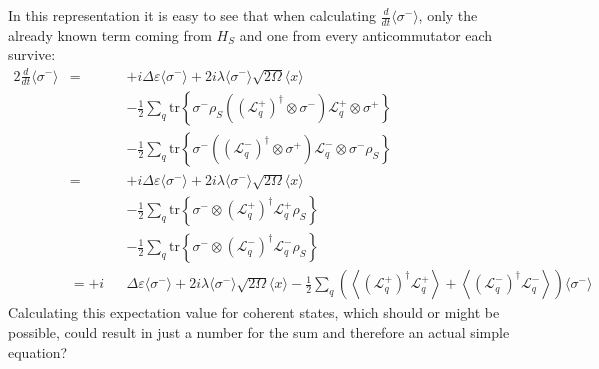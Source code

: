 	In this representation it is easy to see that when calculating $\frac{d}{dt} \langle \sigma^- \rangle$, only the already known term coming from $H_S$ and one from every anticommutator each survive:
	\begin{alignat*}{2}
		\frac{d}{dt} \langle \sigma^- \rangle  &=&&+i \Delta \varepsilon \langle \sigma^- \rangle + 2 i \lambda \langle \sigma^- \rangle \sqrt{2 \Omega} \langle x \rangle \\
		~&~&&-\frac{1}{2} \sum_q \text{tr}\left\{\sigma^- \rho_S  \left(\left(\mathcal{L}_q^+\right)^\dagger \otimes \sigma^-\right) \mathcal{L}_q^+ \otimes \sigma^+ \right\} \\
		~&~&&-\frac{1}{2} \sum_q \text{tr}\left\{\sigma^-\left(\left(\mathcal{L}_q^-\right)^\dagger \otimes \sigma^+\right) \mathcal{L}_q^- \otimes \sigma^- \rho_S \right\} \\
		&= &&+i \Delta \varepsilon \langle \sigma^- \rangle + 2 i \lambda \langle \sigma^- \rangle \sqrt{2 \Omega} \langle x \rangle \\
		~&~&&-\frac{1}{2} \sum_q \text{tr}\left\{\sigma^- \otimes \left(\mathcal{L}_q^+\right)^\dagger \mathcal{L}_q^+  \rho_S  \right\} \\
		~&~&&-\frac{1}{2} \sum_q \text{tr}\left\{\sigma^- \otimes \left(\mathcal{L}_q^-\right)^\dagger  \mathcal{L}_q^- \rho_S \right\} \\
		&= +i &&\Delta \varepsilon \langle \sigma^- \rangle + 2 i \lambda \langle \sigma^- \rangle \sqrt{2 \Omega} \langle x \rangle - \frac{1}{2} \sum_q \left(\left\langle \left(\mathcal{L}_q^+\right)^\dagger \mathcal{L}_q^+\right\rangle  + \left\langle \left(\mathcal{L}_q^-\right)^\dagger \mathcal{L}_q^-\right\rangle \right) \langle \sigma^- \rangle
	\end{alignat*}
	Calculating this expectation value for coherent states, which should or might be possible, could result in just a number for the sum and therefore an actual simple equation?
